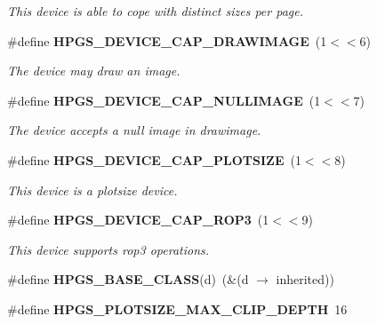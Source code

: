 \begin{CompactItemize}
\begin{CompactList}\small\item\em This device is able to cope with distinct sizes per page. \item\end{CompactList}\item 
\#define {\bf HPGS\_\-DEVICE\_\-CAP\_\-DRAWIMAGE}~(1$<$$<$6)\label{group__device_g0e8d3be8de1ccdc0c814a7d4f50d5ea5}

\begin{CompactList}\small\item\em The device may draw an image. \item\end{CompactList}\item 
\#define {\bf HPGS\_\-DEVICE\_\-CAP\_\-NULLIMAGE}~(1$<$$<$7)\label{group__device_g137bf6ecfa0799889cc3338b3e6e57cf}

\begin{CompactList}\small\item\em The device accepts a null image in drawimage. \item\end{CompactList}\item 
\#define {\bf HPGS\_\-DEVICE\_\-CAP\_\-PLOTSIZE}~(1$<$$<$8)\label{group__device_g6fc3e52dd7ac9e001d1148b075d16e4c}

\begin{CompactList}\small\item\em This device is a plotsize device. \item\end{CompactList}\item 
\#define {\bf HPGS\_\-DEVICE\_\-CAP\_\-ROP3}~(1$<$$<$9)\label{group__device_g35207578b9faef0e1602a6600c73dd39}

\begin{CompactList}\small\item\em This device supports rop3 operations. \item\end{CompactList}\item 
\#define \textbf{HPGS\_\-BASE\_\-CLASS}(d)~(\&(d $\rightarrow$ inherited))\label{group__device_gd40c8bf92012b37cda89ba8ee69a33a1}

\item 
\#define \textbf{HPGS\_\-PLOTSIZE\_\-MAX\_\-CLIP\_\-DEPTH}~16\label{group__device_ge92b44de322e9c1b9fbd0f732aea9077}

\end{CompactItemize}
